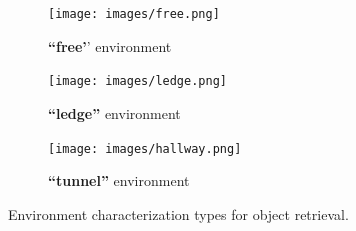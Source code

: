 \documentclass[conference]{IEEEtran}
\begin{document}
\begin{figure}[t]
      \centering
      \begin{subfigure}[t]{0.15\textwidth}
        \texttt{[image: images/free.png]}
        \caption{\textbf{``free'}' environment}
    \end{subfigure}
    \begin{subfigure}[t]{0.15\textwidth}
        \texttt{[image: images/ledge.png]}
        \caption{\textbf{``ledge''} environment}
    \end{subfigure}
        \begin{subfigure}[t]{0.15\textwidth}
        \texttt{[image: images/hallway.png]}
        \caption{\textbf{``tunnel''} environment}
    \end{subfigure}
      \caption{Environment characterization types for object retrieval.}
      \label{fig:characters}
   \end{figure}
\end{document}
